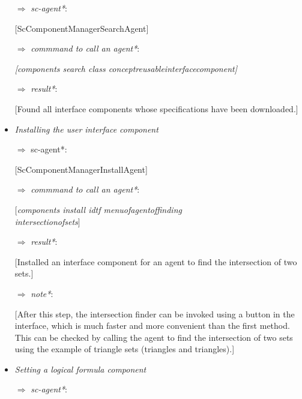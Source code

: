 \documentclass[10pt, a4paper]{article}
\begin{document}
\newpage
\begin{multicols}{2}
\begin{flushleft}
\begin{itemize}
\setlength{\columnsep}{3cm}
\itemindent 0.3cm \item [ $\Rightarrow$]\textit{sc-agent*}:


[ScComponentManagerSearchAgent]
\vspace{-0.2cm}\item [ $\Rightarrow$]\textit{commmand to call an agent*}:

 
\vspace{-0.1cm}\textit{[components search \textendash \textendash class concept\textunderscore reusable\textunderscore interface\textunderscore component]}
\vspace{-0.35cm}\item [ $\Rightarrow$]\textit{result*}:


[Found all interface components whose specifications have been downloaded.]
\itemindent 0cm   \vspace{-0.2cm}  \item \textit{Installing the user interface component}
\itemindent 0.3cm \vspace{-0.3cm}\item [ $\Rightarrow$] sc-agent*:


[ScComponentManagerInstallAgent]
\vspace{-0.3cm}\item [ $\Rightarrow$]\textit{commmand to call an agent*}:


\vspace{-0.1cm}\textit{$[$components install \textendash \textendash idtf menu\textunderscore of\textunderscore agent\textunderscore of\textunderscore finding\textunderscore \\ intersection\textunderscore of\textunderscore sets$]$}
\vspace{-0.4}\item [ $\Rightarrow$]\textit{result*}:


[Installed an interface component for an agent to find the intersection of two sets.]
\vspace{-0.25cm}\item [ $\Rightarrow$]\textit{note*}:


[After this step, the intersection finder can be invoked using a button in the interface, which is much faster and more convenient than the first method. This can be checked by calling the agent to find the intersection of two sets using the example of triangle sets (triangles and triangles).]
\itemindent 0cm \vspace{-0.2cm}    \item \textit{Setting a logical formula component}
\itemindent 0.3cm \vspace{-0.2cm}\item [ $\Rightarrow$]\textit{sc-agent*}:



\end{itemize}
\end{flushleft}
\end{multicols}
\end{document}
